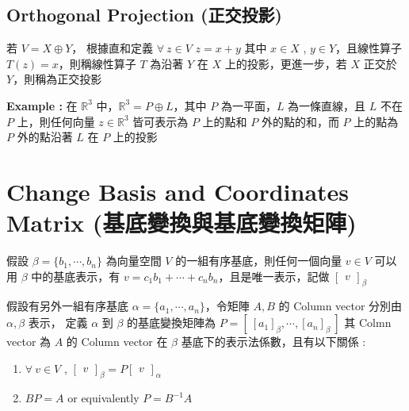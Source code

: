 \documentclass[
]{book}
\providecommand{\tightlist}{%
  \setlength{\itemsep}{0pt}\setlength{\parskip}{0pt}}
\begin{document}
\hypertarget{orthogonal-projection-ux6b63ux4ea4ux6295ux5f71}{%
\subsection{Orthogonal Projection (正交投影)}\label{orthogonal-projection-ux6b63ux4ea4ux6295ux5f71}}

若 \(V = X\oplus Y\)， 根據直和定義 \(\forall \ z \in V\) \(z =x + y\) 其中 \(x \in X\) , \(y \in Y\)，且線性算子 \(T(z) = x\)，則稱線性算子 \(T\) 為沿著 \(Y\) 在 \(X\) 上的投影，更進一步，若 \(X\) 正交於 \(Y\)，則稱為正交投影

\textbf{Example :} 在 \(\mathbb{R}^3\) 中，\(\mathbb{R}^3 = P \oplus L\)，其中 \(P\) 為一平面，\(L\) 為一條直線，且 \(L\) 不在 \(P\) 上，則任何向量 \(z \in \mathbb{R}^3\) 皆可表示為 \(P\) 上的點和 \(P\) 外的點的和，而 \(P\) 上的點為 \(P\) 外的點沿著 \(L\) 在 \(P\) 上的投影

\hypertarget{change-basis-and-coordinates-matrix-ux57faux5e95ux8b8aux63dbux8207ux57faux5e95ux8b8aux63dbux77e9ux9663}{%
\section{Change Basis and Coordinates Matrix (基底變換與基底變換矩陣)}\label{change-basis-and-coordinates-matrix-ux57faux5e95ux8b8aux63dbux8207ux57faux5e95ux8b8aux63dbux77e9ux9663}}

假設 \(\beta = \{b_1 ,\cdots ,b_n\}\) 為向量空間 \(V\) 的一組有序基底，則任何一個向量 \(v \in V\) 可以用 \(\beta\) 中的基底表示，有 \(v = c_1b_1 + \cdots + c_nb_n\)，且是唯一表示，記做 \(\begin{bmatrix}v\end{bmatrix}_{\beta}\)

假設有另外一組有序基底 \(\alpha = \{a_1,\cdots,a_n\}\)，令矩陣 \(A, B\) 的 Column vector 分別由 \(\alpha, \beta\) 表示，
定義 \(\alpha\) 到 \(\beta\) 的基底變換矩陣為 \(P = [\ [a_1]_{\beta}, \cdots, [a_n]_{\beta}\ ]\) 其 Colmn vector 為 \(A\) 的 Column vector 在 \(\beta\) 基底下的表示法係數，且有以下關係 :

\begin{enumerate}
\def\labelenumi{\arabic{enumi}.}
\tightlist
\item
  \(\forall\ v \in V\) , \(\begin{bmatrix}v\end{bmatrix} _{\beta} = P\begin{bmatrix}v\end{bmatrix}_{\alpha}\)
\item
  \(BP = A\) or equivalently \(P = B^{-1}A\)
\end{enumerate}
\end{document}
